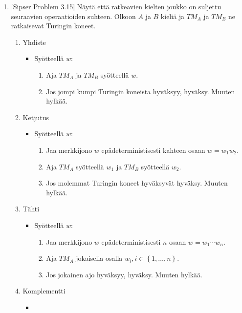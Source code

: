 \documentclass[finnish,11pt]{article}
\newcommand{\set}[1]{{\left\{ #1 \right\}}}
\begin{document}
\begin{enumerate}
\item
  {[Sipser Problem 3.15]} Näytä että ratkeavien kielten joukko on suljettu
  seuraavien operaatioiden suhteen.
%
  Olkoon $A$ ja $B$ kieliä ja $TM_A$ ja $TM_B$ ne ratkaisevat Turingin koneet.
  \begin{enumerate}
  \item Yhdiste
    \begin{itemize}
    \item
      Syötteellä $w$:
      \begin{enumerate}[label=\arabic*.]
      \item
        Aja $TM_A$ ja $TM_B$ syötteellä $w$.
      \item
        Jos jompi kumpi Turingin koneista hyväksyy, hyväksy. Muuten hylkää.
      \end{enumerate}
    \end{itemize}
  \item Ketjutus
    \begin{itemize}
    \item
      Syötteellä $w$:
      \begin{enumerate}[label=\arabic*.]
      \item
        Jaa merkkijono $w$ epädeterministisesti kahteen osaan $w = w_1w_2$.
      \item
        Aja $TM_A$ syötteellä $w_1$ ja $TM_B$ syötteellä $w_2$.
      \item
        Jos molemmat Turingin koneet hyväksyvät hyväksy. Muuten hylkää.
      \end{enumerate}
    \end{itemize}
  \item Tähti
    \begin{itemize}
    \item
      Syötteellä $w$:
      \begin{enumerate}[label=\arabic*.]
      \item
        Jaa merkkijono $w$ epädeterministisesti $n$ osaan $w = w_1 \cdots
        w_n$.
      \item
        Aja $TM_A$ jokaisella osalla $w_i, i \in \set{1, \dots, n}$.
      \item
        Jos jokainen ajo hyväksyy, hyväksy. Muuten hylkää.
      \end{enumerate}
    \end{itemize}
  \item Komplementti
    \begin{itemize}
    \item

\end{itemize}
\end{enumerate}
\end{enumerate}
\end{document}
